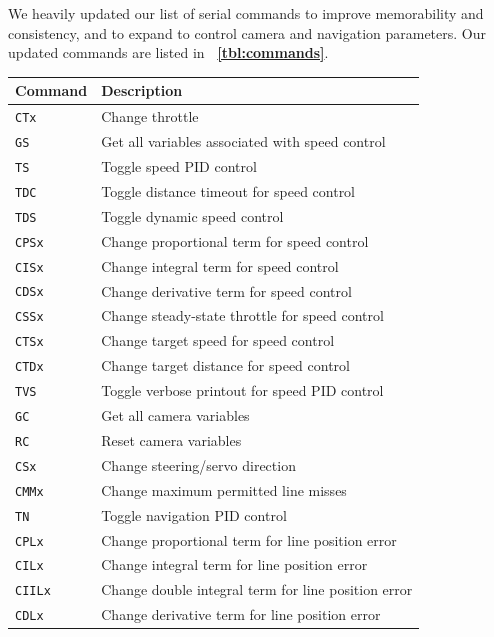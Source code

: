 \documentclass[letterpaper, 11pt]{article}
\newcommand*{\tblref}[1]{\textbf{\tablename~\ref{#1}}}
\begin{document}
\begin{enumerate}[label=\textbf{\arabic*.}]
We heavily updated our list of serial commands to improve memorability and consistency, and to expand to control camera and navigation parameters. Our updated commands are listed in \tblref{tbl:commands}.
\begin{table}[ht]
    \centering
    \begin{tabular}{@{}ll@{}}
        \toprule
        \textbf{Command} & \textbf{Description} \\ \midrule
        \texttt{CTx} & Change throttle \\
        \texttt{GS} & Get all variables associated with speed control \\
        \texttt{TS} & Toggle speed PID control \\
        \texttt{TDC} & Toggle distance timeout for speed control \\
        \texttt{TDS} & Toggle dynamic speed control \\
        \texttt{CPSx} & Change proportional term for speed control \\
        \texttt{CISx} & Change integral term for speed control \\
        \texttt{CDSx} & Change derivative term for speed control \\
        \texttt{CSSx} & Change steady-state throttle for speed control \\
        \texttt{CTSx} & Change target speed for speed control \\
        \texttt{CTDx} & Change target distance for speed control \\
        \texttt{TVS} & Toggle verbose printout for speed PID control \\ \midrule
        \texttt{GC} & Get all camera variables \\
        \texttt{RC} & Reset camera variables \\
        \texttt{CSx} & Change steering/servo direction \\
        \texttt{CMMx} & Change maximum permitted line misses \\ \midrule
        \texttt{TN} & Toggle navigation PID control \\
        \texttt{CPLx} & Change proportional term for line position error \\
        \texttt{CILx} & Change integral term for line position error \\
        \texttt{CIILx} & Change double integral term for line position error \\
        \texttt{CDLx} & Change derivative term for line position error \\

\end{tabular}
\end{table}
\end{enumerate}
\end{document}
